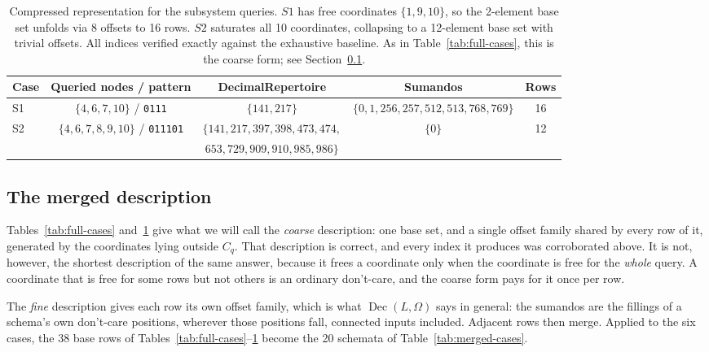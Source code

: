 \documentclass[11pt]{article}
\begin{document}
\begin{table}[h]
\centering
\small
\setlength{\tabcolsep}{3pt}
\begin{adjustbox}{max width=\textwidth,center}
\begin{tabular}{@{}lcccc@{}}
\toprule
Case & Queried nodes / pattern & DecimalRepertoire & Sumandos & Rows \\
\midrule
S1 & $\{4,6,7,10\}$ / \texttt{0111} & $\{141,217\}$ &
  $\{0,1,256,257,512,513,768,769\}$ & 16 \\
S2 & $\{4,6,7,8,9,10\}$ / \texttt{011101} &
  $\{141,217,397,398,473,474,$ &
  $\{0\}$ & 12 \\
   & & $653,729,909,910,985,986\}$ & & \\
\bottomrule
\end{tabular}
\end{adjustbox}
\caption{Compressed representation for the subsystem queries.
$S1$ has free coordinates $\{1,9,10\}$, so the 2-element base set
unfolds via 8 offsets to 16 rows.
$S2$ saturates all 10 coordinates, collapsing to a 12-element base set
with trivial offsets.
All indices verified exactly against the exhaustive baseline.
As in Table~\ref{tab:full-cases}, this is the coarse form; see
Section~\ref{sec:merged}.}
\label{tab:subsystem-cases}
\end{table}


\subsection{The merged description}\label{sec:merged}

Tables~\ref{tab:full-cases} and~\ref{tab:subsystem-cases} give what we will
call the \emph{coarse} description: one base set, and a single offset family
shared by every row of it, generated by the coordinates lying outside $C_q$.
That description is correct, and every index it produces was corroborated
above.  It is not, however, the shortest description of the same answer,
because it frees a coordinate only when the coordinate is free for the
\emph{whole} query.  A coordinate that is free for some rows but not others
is an ordinary don't-care, and the coarse form pays for it once per row.

The \emph{fine} description gives each row its own offset family, which is
what $\operatorname{Dec}(L,\Omega)$ says in general: the sumandos are the
fillings of a schema's own don't-care positions, wherever those positions
fall, connected inputs included.  Adjacent rows then merge.  Applied to the
six cases, the 38 base rows of
Tables~\ref{tab:full-cases}--\ref{tab:subsystem-cases} become the 20 schemata
of Table~\ref{tab:merged-cases}.
\end{document}
